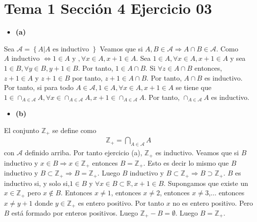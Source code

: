 \documentclass{article}
\begin{document}
\section{Tema 1 Sección 4 Ejercicio 03}
\begin{itemize}
\item \bf (a) \rm 
\end{itemize}
Sea \(\mathcal{A}=\left\{ A| A\text{ es inductivo }\right\}\) Veamos que si \(A, B\in\mathcal{A}\Rightarrow A \cap B\in\mathcal{A}\). Como \(A \text{ inductivo } \Leftrightarrow  1\in A \text{ y },\forall x\in A, x+1\in A\). Sea \(1\in A,\forall x\in A, x+1\in A\) y sea \(1\in B,\forall y\in B, y+1\in B\). Por tanto, \(1\in A\cap B\). Si \(\forall z\in A\cap B\) entonces, \(z+1 \in A\) y \(z+1 \in B\) por tanto,  \(z+1 \in A\cap B\). Por tanto, \(A\cap B\) es inductivo. Por tanto, si para todo \(A\in \mathcal{A}, 1\in A, \forall x\in  A, x+1\in A\) se tiene que \(1\in \cap_{A\in \mathcal{A}}A, \forall x \in\cap_{A\in\mathcal{A}}A,x+1 \in\cap_{A\in\mathcal{A}}A\). Por tanto, \(\cap_{A\in\mathcal{A}}A\) es inductivo.
\begin{itemize}
\item \bf (b) \rm 
\end{itemize}
El conjunto \(\mathbb{Z}_{+}\) se define como
\begin{eqnarray}
\mathbb{Z}_{+}=\bigcap_{A\in \mathcal{A}}A \nonumber
\end{eqnarray}
con \(\mathcal{A}\) definido arriba. Por tanto ejercicio (a), \(\mathbb{Z}_{+}\) es inductivo. Veamos que si \(B\) inductivo y \(x\in B \Rightarrow x\in \mathbb{Z}_{+}\) entonces \(B=\mathbb{Z}_{+}\). Esto es decir lo mismo que \(B\) inductivo y \(B \subset \mathbb{Z}_{+} \Rightarrow B=\mathbb{Z}_{+}\). Luego \(B\) inductivo y \(B\subset \mathbb{Z}_{+}\Rightarrow B\supset \mathbb{Z}_{+}\). \(B\) es inductivo si, y solo si,\(1\in B\) y \(\forall x\in B\subset \mathbb{R}, x+1 \in B\). Supongamos que existe un \(x\in \mathbb{Z}_{+}\) pero \(x\notin B\). Entonces \(x\neq 1\), entonces \(x\neq 2\), entonces \(x\neq 3\),... entonces \(x\neq y+1\) donde \(y\in \mathbb{Z}_{+}\) es entero positivo. Por tanto \(x\) no es entero positivo.  Pero \(B\) está formado por enteros positivos. Luego \(\mathbb{Z}_{+}-B=\emptyset\). Luego \(B=\mathbb{Z}_{+}\).
\end{document}
